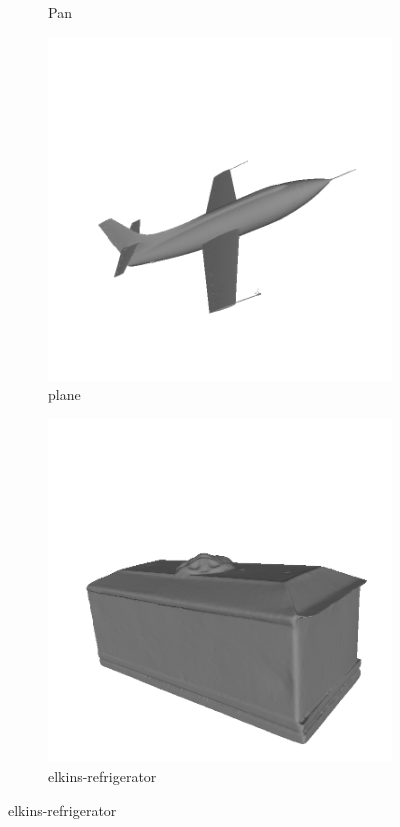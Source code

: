 \begin{figure}[!h]
\begin{subfigure}[b]{0.23\linewidth}
		\caption{Pan}
	\end{subfigure}
	\begin{subfigure}[b]{0.23\linewidth}
		\includegraphics[width=\linewidth]{./Figures/train-dataset/34.plane.png}
		\caption{plane}
	\end{subfigure}
	\begin{subfigure}[b]{0.23\linewidth}
		\includegraphics[width=\linewidth]{./Figures/train-dataset/35.elkins-refrigerator.png}
		\caption{elkins-refrigerator}
	\end{subfigure}


\end{figure}
